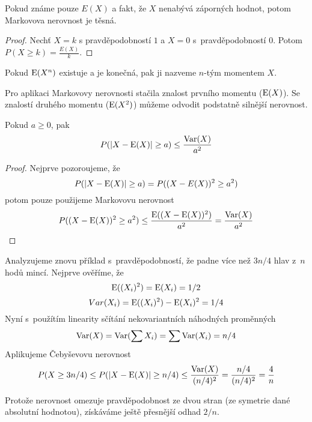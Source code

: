 \begin{theorem}
    Pokud známe pouze $E(X)$ a fakt, že $X$ nenabývá záporných hodnot,
    potom Markovova nerovnost je těsná.
\end{theorem}

\begin{proof}
    Nechť $X = k$ s pravděpodobností $1$
    a $X = 0$ s~pravděpodobností $0$.
    Potom $P(X \geq k) = \frac{E(X)}{k}$.
\end{proof}

\begin{definition}
    Pokud $\operatorname{E}(X^n)$ existuje a je konečná, pak ji nazveme $n$-tým
    momentem $X$.
\end{definition}

Pro aplikaci Markovovy nerovnosti stačila znalost prvního momentu
($\operatorname{E}(X)$). Se znalostí druhého momentu ($\operatorname{E}(X^2)$) můžeme
odvodit podstatně silnější nerovnost.

\pagebreak

\begin{theorem}
    Pokud $a \geq 0$, pak
    \[
        P(\lvert X - \operatorname{E}(X) \rvert \geq a) \leq \frac{\operatorname{Var}(X)}{a^2}
    \]
\end{theorem}

\begin{proof}
    Nejprve pozoroujeme, že
    \[
        P(\lvert X - \operatorname{E}(X) \rvert \geq a)
        = P((X - E(X))^2 \geq a^2)
\]
    potom pouze použijeme Markovovu nerovnost
    \[
        P((X - \operatorname{E}(X))^2 \geq a^2)
        \leq \frac{\operatorname{E}((X - \operatorname{E}(X))^2)}{a^2}
        = \frac{\operatorname{Var}(X)}{a^2}
        \qedhere
    \]
\end{proof}

\begin{example}
    Analyzujeme znovu příklad s~pravděpodobností, že padne více než
    $3n/4$ hlav z~$n$ hodů mincí. Nejprve ověříme, že
    \[
        \operatorname{E}((X_i)^2) = \operatorname{E}(X_i) = 1/2
    \]\[
        Var(X_i) = \operatorname{E}((X_i)^2) - \operatorname{E}(X_i)^2 = 1/4
    \]
    Nyní s~použítím linearity sčítání nekovariantních náhodných
    proměnných
    \[
        \operatorname{Var}(X) = \operatorname{Var}(\sum X_i) = \sum \operatorname{Var}(X_i) = n/4
    \]
    Aplikujeme Čebyševovu nerovnost
    \[
        P(X \geq 3n/4 ) \leq P(\lvert X - \operatorname{E}(X) \rvert \geq n/4)
                     \leq \frac{\operatorname{Var}(X)}{(n/4)^2}
                     = \frac{n/4}{(n/4)^2}
                    = \frac{4}{n}
    \]

    Protože nerovnost omezuje pravděpodobnost ze dvou stran (ze symetrie
    dané absolutní hodnotou), získáváme ještě přesnější odhad $2/n$.
\end{example}

